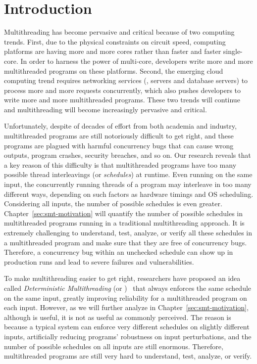 \chapter{Introduction} \label{sec:intro}

Multithreading has become pervasive and critical because of two computing
trends. First, due to the physical constraints on circuit speed, computing
platforms are having more and more cores rather than faster and faster
single-core. In order to harness the power of multi-core, developers write more
and more multithreaded programs on these platforms. Second, the emerging cloud
computing trend requires networking services (\eg, \http servers and database
servers) to process more and more requests concurrently, which also pushes
developers to write more and more multithreaded programs. These two trends will
continue and multithreading will become increasingly pervasive and critical.

Unfortunately, despite of decades of effort from both academia and industry,
multithreaded programs are still notoriously difficult to get right, and these
programs are plagued with harmful concurrency bugs that can cause wrong outputs,
program crashes, security breaches, and so on. Our research reveals that a key
reason of this difficulty is that multithreaded programs have too many
possible thread interleavings (or \emph{schedules}) at runtime. Even running on 
the same input, the concurrently running threads of a program may interleave in 
too many different ways, depending on such factors as hardware timings and OS
scheduling. Considering all inputs, the number of possible schedules is even
greater. Chapter~\ref{sec:smt-motivation} will quantify the number of
possible schedules in multithreaded programs running in a traditional
multithreading approach. It is extremely challenging to understand, test, 
analyze, or verify all these schedules in a multithreaded program and 
make sure that they are free of concurrency bugs. Therefore, a concurrency bug 
within an unchecked schedule can show up in production runs and lead to severe 
failures and vulnerabilities.

To make multithreading easier to get right, researchers have proposed an idea 
called \emph{Deterministic Multithreading} (or 
\emph{\dmt})~\cite{dthreads:sosp11, dpj:oopsla09, dmp:asplos09, kendo:asplos09, 
coredet:asplos10} that always enforces the same schedule on the same input, 
greatly improving reliability for a multithreaded program on each input. 
However, as we will further analyze in
Chapter~\ref{sec:smt-motivation}, although \dmt is useful, it is not as useful
as commonly perceived. The reason is because a typical \dmt system can enforce
very different schedules on slightly different inputs, artificially reducing
programs' robustness on input perturbations, and the number of possible
schedules on all inputs are still enormous. Therefore, multithreaded programs
are still very hard to understand, test, analyze, or verify.

